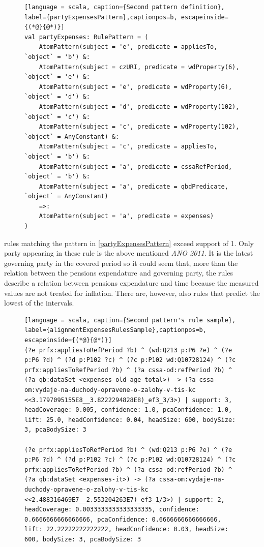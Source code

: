 \begin{figure}[h]
\begin{lstlisting}[language = scala, caption={Second pattern definition}, label={partyExpensesPattern},captionpos=b, escapeinside={(*@}{@*)}]
val partyExpenses: RulePattern = (
    AtomPattern(subject = 'e', predicate = appliesTo, `object` = 'b') &:
    AtomPattern(subject = czURI, predicate = wdProperty(6), `object` = 'e') &:
    AtomPattern(subject = 'e', predicate = wdProperty(6), `object` = 'd') &:
    AtomPattern(subject = 'd', predicate = wdProperty(102), `object` = 'c') &:  
    AtomPattern(subject = 'c', predicate = wdProperty(102), `object` = AnyConstant) &:
    AtomPattern(subject = 'c', predicate = appliesTo, `object` = 'b') &:
    AtomPattern(subject = 'a', predicate = cssaRefPeriod, `object` = 'b') &:
    AtomPattern(subject = 'a', predicate = qbdPredicate, `object` = AnyConstant)
    =>:
    AtomPattern(subject = 'a', predicate = expenses)
)
\end{lstlisting}
\end{figure}

 rules matching the pattern in \ref{partyExpensesPattern} exceed support of 1. Only party appearing in these rule is the above mentioned \textit{ANO 2011}. It is the latest governing party in the covered period so it could seem that, more than the relation between the pensions expendature and governing party, the rules describe a relation between pensions expendature and time because the measured values are not treated for inflation. There are, however, also rules that predict the lowest of the intervals.

\begin{figure}[h]
\begin{lstlisting}[language = scala, caption={Second pattern's rule sample}, label={alignmentExpensesRulesSample},captionpos=b, escapeinside={(*@}{@*)}]
(?e prfx:appliesToRefPeriod ?b) ^ (wd:Q213 p:P6 ?e) ^ (?e p:P6 ?d) ^ (?d p:P102 ?c) ^ (?c p:P102 wd:Q10728124) ^ (?c prfx:appliesToRefPeriod ?b) ^ (?a cssa-od:refPeriod ?b) ^ (?a qb:dataSet <expenses-old-age-total>) -> (?a cssa-om:vydaje-na-duchody-opravene-o-zalohy-v-tis-kc <<3.1797095155E8__3.8222294828E8)_ef3_3/3>) | support: 3, headCoverage: 0.005, confidence: 1.0, pcaConfidence: 1.0, lift: 25.0, headConfidence: 0.04, headSize: 600, bodySize: 3, pcaBodySize: 3

(?e prfx:appliesToRefPeriod ?b) ^ (wd:Q213 p:P6 ?e) ^ (?e p:P6 ?d) ^ (?d p:P102 ?c) ^ (?c p:P102 wd:Q10728124) ^ (?c prfx:appliesToRefPeriod ?b) ^ (?a cssa-od:refPeriod ?b) ^ (?a qb:dataSet <expenses-it>) -> (?a cssa-om:vydaje-na-duchody-opravene-o-zalohy-v-tis-kc <<2.488316469E7__2.553204263E7)_ef3_1/3>) | support: 2, headCoverage: 0.0033333333333333335, confidence: 0.6666666666666666, pcaConfidence: 0.6666666666666666, lift: 22.22222222222222, headConfidence: 0.03, headSize: 600, bodySize: 3, pcaBodySize: 3
\end{lstlisting}
\end{figure}

